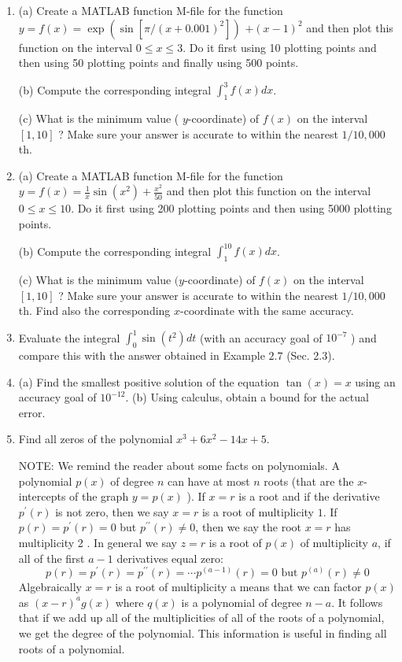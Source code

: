 \documentclass[../main.tex]{subfiles}
\begin{document}
\begin{enumerate}
\item (a) Create a MATLAB function M-file for the function $y=f(x)=\exp \left(\sin \left[\pi /(x+0.001)^{2}\right]\right)$ $+(x-1)^{2}$ and then plot this function on the interval $0 \leq x \leq 3$. Do it first using 10 plotting points and then using 50 plotting points and finally using 500 points.

(b) Compute the corresponding integral $\int_{1}^{3} f(x) d x$.

(c) What is the minimum value ( $y$-coordinate) of $f(x)$ on the interval $[1,10]$ ? Make sure your answer is accurate to within the nearest $1 / 10,000$th.

\item (a) Create a MATLAB function M-file for the function $y=f(x)=\frac{1}{x} \sin \left(x^{2}\right)+\frac{x^{2}}{50}$ and then plot this function on the interval $0 \leq x \leq 10$. Do it first using 200 plotting points and then using 5000 plotting points.
 
 (b) Compute the corresponding integral $\int_{1}^{10} f(x) d x$.

(c) What is the minimum value $(y$-coordinate) of $f(x)$ on the interval $[1,10]$ ? Make sure your answer is accurate to within the nearest $1 / 10,000$ th. Find also the corresponding $x$-coordinate with the same accuracy.

\item Evaluate the integral $\int_{0}^{1} \sin \left(t^{2}\right) d t$ (with an accuracy goal of $10^{-7}$ ) and compare this with the answer obtained in Example $2.7$ (Sec. 2.3).

\item (a) Find the smallest positive solution of the equation $\tan (x)=x$ using an accuracy goal of $10^{-12}$. (b) Using calculus, obtain a bound for the actual error.

\item Find all zeros of the polynomial $x^{3}+6 x^{2}-14 x+5$.

NOTE: We remind the reader about some facts on polynomials. A polynomial $p(x)$ of degree $n$ can have at most $n$ roots (that are the $x$-intercepts of the graph $y=p(x)$ ). If $x=r$ is a root and if the derivative $p^{\prime}(r)$ is not zero, then we say $x=r$ is a root of multiplicity $1 .$ If $p(r)=p^{\prime}(r)=0$ but $p^{\prime \prime}(r) \neq 0$, then we say the root $x=r$ has multiplicity 2 . In general we say $z=r$ is a root of $p(x)$ of multiplicity $a$, if all of the first $a-1$ derivatives equal zero:
$$
p(r)=p^{\prime}(r)=p^{\prime \prime}(r)=\cdots p^{(a-1)}(r)=0 \text { but } p^{(a)}(r) \neq 0
$$
Algebraically $x=r$ is a root of multiplicity a means that we can factor $p(x)$ as $(x-r)^{a} g(x)$ where $q(x)$ is a polynomial of degree $n-a$. It follows that if we add up all of the multiplicities of all of the roots of a polynomial, we get the degree of the polynomial. This information is useful in finding all roots of a polynomial.


\end{enumerate}
\end{document}

